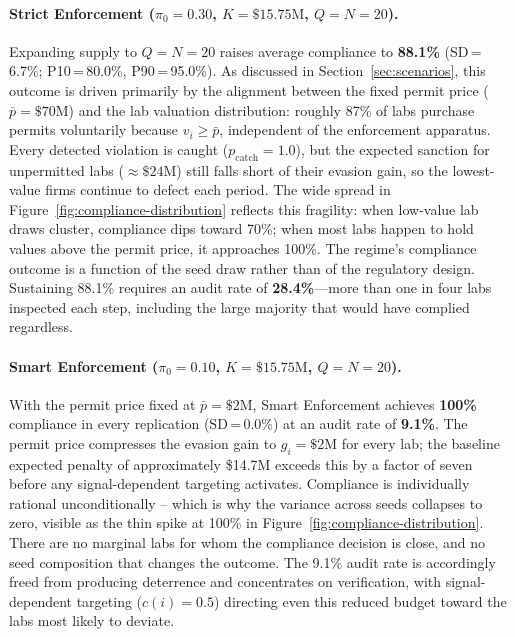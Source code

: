 \paragraph{Strict Enforcement ($\pi_0 = 0.30$, $K = \$15.75\text{M}$, $Q = N = 20$).}

Expanding supply to $Q = N = 20$ raises average compliance to \textbf{88.1\%} (SD\,=\,6.7\%; P10\,=\,80.0\%, P90\,=\,95.0\%). As discussed in Section~\ref{sec:scenarios}, this outcome is driven primarily by the alignment between the fixed permit price ($\bar{p} = \$70$M) and the lab valuation distribution: roughly 87\% of labs purchase permits voluntarily because $v_i \geq \bar{p}$, independent of the enforcement apparatus. Every detected violation is caught ($p_\mathrm{catch} = 1.0$), but the expected sanction for unpermitted labs ($\approx\!\$24$M) still falls short of their evasion gain, so the lowest-value firms continue to defect each period. The wide spread in Figure~\ref{fig:compliance-distribution} reflects this fragility: when low-value lab draws cluster, compliance dips toward 70\%; when most labs happen to hold values above the permit price, it approaches 100\%. The regime's compliance outcome is a function of the seed draw rather than of the regulatory design. Sustaining 88.1\% requires an audit rate of \textbf{28.4\%}---more than one in four labs inspected each step, including the large majority that would have complied regardless.

\paragraph{Smart Enforcement ($\pi_0 = 0.10$, $K = \$15.75\text{M}$, $Q = N = 20$).}

With the permit price fixed at $\bar{p} = \$2$M, Smart Enforcement achieves \textbf{100\%} compliance in every replication (SD\,=\,0.0\%) at an audit rate of \textbf{9.1\%}. The permit price compresses the evasion gain to $g_i = \$2$M for every lab; the baseline expected penalty of approximately \$14.7M exceeds this by a factor of seven before any signal-dependent targeting activates. Compliance is individually rational unconditionally -- which is why the variance across seeds collapses to zero, visible as the thin spike at 100\% in Figure~\ref{fig:compliance-distribution}. There are no marginal labs for whom the compliance decision is close, and no seed composition that changes the outcome. The 9.1\% audit rate is accordingly freed from producing deterrence and concentrates on verification, with signal-dependent targeting ($c(i) = 0.5$) directing even this reduced budget toward the labs most likely to deviate.

